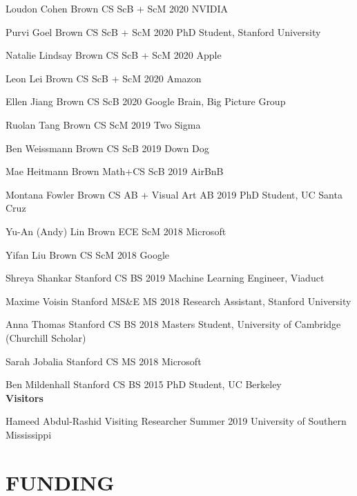 \documentclass[line,margin]{res}
\begin{document}
\begin{resume}
\alumni
{Loudon Cohen}
{Brown CS ScB + ScM}
{2020}
{NVIDIA}

\alumni
{Purvi Goel}
{Brown CS ScB + ScM}
{2020}
{PhD Student, Stanford University}

\alumni
{Natalie Lindsay}
{Brown CS ScB + ScM}
{2020}
{Apple}

\alumni
{Leon Lei}
{Brown CS ScB + ScM}
{2020}
{Amazon}

\alumni
{Ellen Jiang}
{Brown CS ScB}
{2020}
{Google Brain, Big Picture Group}


\alumni
{Ruolan Tang}
{Brown CS ScM}
{2019}
{Two Sigma}

\alumni
{Ben Weissmann}
{Brown CS ScB}
{2019}
{Down Dog}

\alumni
{Mae Heitmann}
{Brown Math+CS ScB}
{2019}
{AirBnB}

\alumni
{Montana Fowler}
{Brown CS AB + Visual Art AB}
{2019}
{PhD Student, UC Santa Cruz}

\alumni
{Yu-An (Andy) Lin}
{Brown ECE ScM}
{2018}
{Microsoft}

\alumni
{Yifan Liu}
{Brown CS ScM}
{2018}
{Google}

\alumni
{Shreya Shankar}
{Stanford CS BS}
{2019}
{Machine Learning Engineer, Viaduct}

\alumni
{Maxime Voisin}
{Stanford MS\&E MS}
{2018}
{Research Assistant, Stanford University}

\alumni
{Anna Thomas}
{Stanford CS BS}
{2018}
{Masters Student, University of Cambridge (Churchill Scholar)}

\alumni
{Sarah Jobalia}
{Stanford CS MS}
{2018}
{Microsoft}

\alumni
{Ben Mildenhall}
{Stanford CS BS}
{2015}
{PhD Student, UC Berkeley}
\\


\textbf{Visitors}

\visitor
{Hameed Abdul-Rashid}
{Visiting Researcher}
{Summer 2019}
{University of Southern Mississippi}


\section{FUNDING}

\newcommand{\funding}[5] {
	\textbf{#1} \hfill #5\\
	#2 \\
	#3. #4
}


\end{resume}
\end{document}
